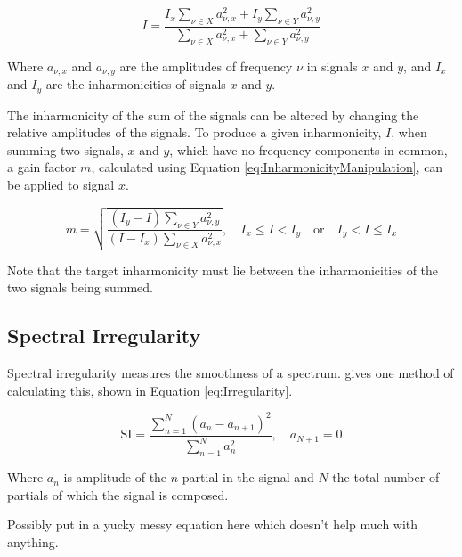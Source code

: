 		\begin{equation}
			I = \frac{I_{x}\sum_{\nu \in X} a_{\nu,x}^{2} + I_{y}\sum_{\nu \in Y} a_{\nu,y}^{2}}
			         {\sum_{\nu \in X} a_{\nu,x}^{2} + \sum_{\nu \in Y} a_{\nu,y}^{2}}
			\label{eq:InharmonicitySum}
		\end{equation}

		Where $a_{\nu,x}$ and $a_{\nu,y}$ are the amplitudes of frequency $\nu$ in signals $x$ and $y$, and $I_{x}$
		and $I_{y}$ are the inharmonicities of signals $x$ and $y$.

		The inharmonicity of the sum of the signals can be altered by changing the relative amplitudes of the
		signals. To produce a given inharmonicity, $I$, when summing two signals, $x$ and $y$, which have no
		frequency components in common, a gain factor $m$, calculated using Equation
		\ref{eq:InharmonicityManipulation}, can be applied to signal $x$.

		\begin{equation}
			m = \sqrt{\frac{(I_{y} - I)\sum_{\nu \in Y} a_{\nu,y}^{2}}
			               {(I - I_{x})\sum_{\nu \in X} a_{\nu,x}^{2}}},
			\quad I_{x} \leq I < I_{y} \quad \textrm{or} \quad I_{y} < I \leq I_{x}
			\label{eq:InharmonicityManipulation}
		\end{equation}

		Note that the target inharmonicity must lie between the inharmonicities of the two signals being summed.

	\subsection{Spectral Irregularity}
	\label{sec:FetureControl-Parameterisation-Irregularity}
		Spectral irregularity measures the smoothness of a spectrum. \citet{jensen1999timbre} gives one method of
		calculating this, shown in Equation \ref{eq:Irregularity}.

		\begin{equation}
			\textrm{SI} = \frac{\sum_{n = 1}^{N} (a_{n} - a_{n+1})^{2}}
			                   {\sum_{n = 1}^{N} a_{n}^{2}},
			              \quad a_{N+1} = 0
			\label{eq:Irregularity}
		\end{equation}

		Where $a_{n}$ is amplitude of the $n$ partial in the signal and $N$ the total number of partials
		of which the signal is composed.

		\note
		{
			Possibly put in a yucky messy equation here which doesn't help much with anything.
		}

